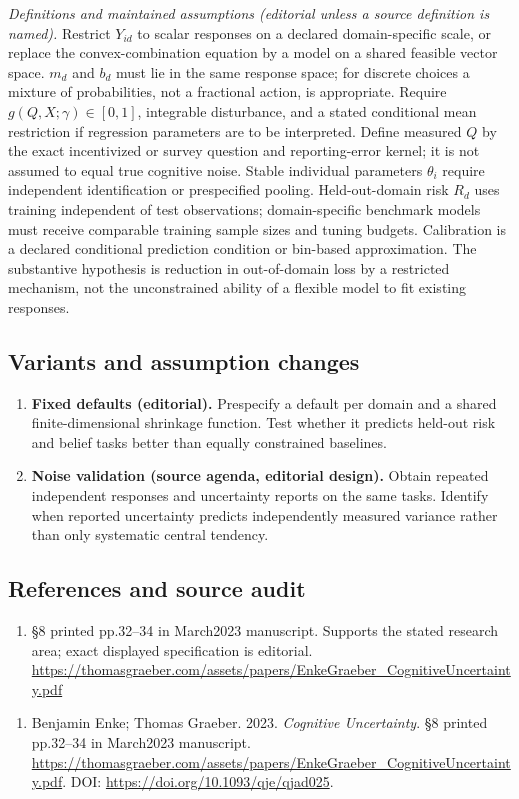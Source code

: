 \documentclass[11pt,a4paper]{article}
\begin{document}
\emph{Definitions and maintained assumptions (editorial unless a source definition is named).} Restrict \(Y_{id}\) to scalar responses on a declared domain-specific scale, or replace the convex-combination equation by a model on a shared feasible vector space. \(m_d\) and \(b_d\) must lie in the same response space; for discrete choices a mixture of probabilities, not a fractional action, is appropriate. Require \(g(Q,X;\gamma)\in[0,1]\), integrable disturbance, and a stated conditional mean restriction if regression parameters are to be interpreted. Define measured \(Q\) by the exact incentivized or survey question and reporting-error kernel; it is not assumed to equal true cognitive noise. Stable individual parameters \(\theta_i\) require independent identification or prespecified pooling. Held-out-domain risk \(R_d\) uses training independent of test observations; domain-specific benchmark models must receive comparable training sample sizes and tuning budgets. Calibration is a declared conditional prediction condition or bin-based approximation. The substantive hypothesis is reduction in out-of-domain loss by a restricted mechanism, not the unconstrained ability of a flexible model to fit existing responses.
\subsection*{Variants and assumption changes}
\begin{enumerate}
\item \textbf{Fixed defaults (editorial).} Prespecify a default per domain and a shared finite-dimensional shrinkage function. Test whether it predicts held-out risk and belief tasks better than equally constrained baselines.
\item \textbf{Noise validation (source agenda, editorial design).} Obtain repeated independent responses and uncertainty reports on the same tasks. Identify when reported uncertainty predicts independently measured variance rather than only systematic central tendency.
\end{enumerate}
\subsection*{References and source audit}
\begin{enumerate}
\item §8 printed pp.32–34 in March2023 manuscript. Supports the stated research area; exact displayed specification is editorial. \url{https://thomasgraeber.com/assets/papers/EnkeGraeber_CognitiveUncertainty.pdf}
\end{enumerate}
\begin{enumerate}\raggedright
\item\hypertarget{definitions:source:30007583:1}{} Benjamin Enke; Thomas Graeber. 2023. \emph{Cognitive Uncertainty}. §8 printed pp.32–34 in March2023 manuscript.
\url{https://thomasgraeber.com/assets/papers/EnkeGraeber_CognitiveUncertainty.pdf}.
DOI: \url{https://doi.org/10.1093/qje/qjad025}.
\end{enumerate}
\end{document}
